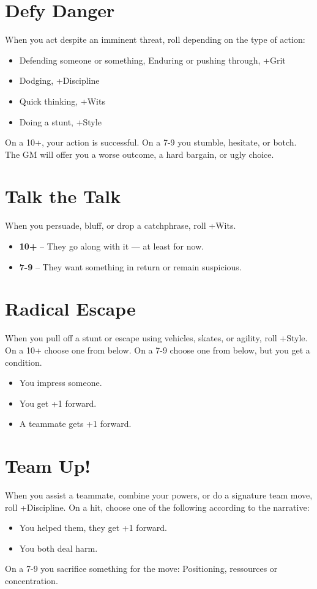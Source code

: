 \documentclass{book}
\begin{document}
\section*{Defy Danger}
When you act despite an imminent threat, roll depending on the type of action:
\begin{itemize}
    \item Defending someone or something, Enduring or pushing through, +Grit
    \item Dodging, +Discipline
    \item Quick thinking, +Wits
    \item Doing a stunt, +Style
\end{itemize}
On a 10+, your action is successful. On a 7-9 you stumble, hesitate, or botch. The GM will offer you a worse outcome, a hard bargain, or ugly choice. 

\section*{Talk the Talk}
When you persuade, bluff, or drop a catchphrase, roll +Wits.
\begin{itemize}
    \item \textbf{10+} -- They go along with it — at least for now.
    \item \textbf{7-9} -- They want something in return or remain suspicious.
\end{itemize}

\section*{Radical Escape}
When you pull off a stunt or escape using vehicles, skates, or agility, roll +Style. On a 10+ choose one from below. On a 7-9 choose one from below, but you get a condition.
\begin{itemize}
    \item You impress someone.
    \item You get +1 forward.
    \item A teammate gets +1 forward.
\end{itemize}

\section*{Team Up!}
When you assist a teammate, combine your powers, or do a signature team move, roll +Discipline. On a hit, choose one of the following according to the narrative:
\begin{itemize}
    \item You helped them, they get +1 forward.
    \item You both deal harm.
\end{itemize}
On a 7-9 you sacrifice something for the move: Positioning, ressources or concentration. 
\end{document}
